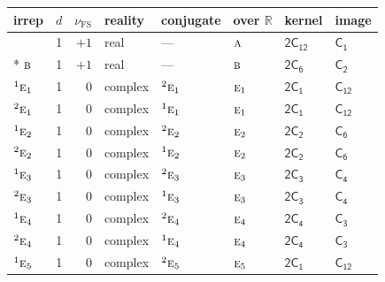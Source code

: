 \documentclass[10pt,a4paper]{article}
\numberwithin{equation}{section}
\newcommand{\grp}[1]{\mathsf{#1}}
\newcommand{\irr}[1]{\text{\normalfont\scshape #1}}
\newcommand{\conjpair}[1]{{}^{#1}}
\newcommand{\detbox}[1]{{\setlength{\fboxsep}{1pt}\fbox{#1}}}
\newcommand{\fsind}{\nu_{\mathrm{FS}}}
\begin{document}
{\small\renewcommand{\arraystretch}{1.25}\setlength{\tabcolsep}{4pt}\begin{longtable}{@{}lrrlllll@{}}\toprule
irrep & $d$ & $\fsind$ & reality & conjugate & over $\mathbb{R}$ & kernel & image\\\midrule\endhead
\bottomrule\endfoot\endlastfoot
\detbox{$\irr{a}$} & 1 & $+1$ & real & --- & $\irr{a}$ & \href{2C12.pdf}{$\grp{2C_{12}}$} & \href{../../../rotation/data/pdf/C1.pdf}{$\grp{C_{1}}$}\\*
$\irr{b}$ & 1 & $+1$ & real & --- & $\irr{b}$ & \href{2C6.pdf}{$\grp{2C_{6}}$} & \href{../../../rotation/data/pdf/C2.pdf}{$\grp{C_{2}}$}\\
$\conjpair{1}\irr{e}_{1}$ & 1 & $0$ & complex & $\conjpair{2}\irr{e}_{1}$ & $\irr{e}_{1}$ & \href{2C1.pdf}{$\grp{2C_{1}}$} & \href{../../../rotation/data/pdf/C12.pdf}{$\grp{C_{12}}$}\\
$\conjpair{2}\irr{e}_{1}$ & 1 & $0$ & complex & $\conjpair{1}\irr{e}_{1}$ & $\irr{e}_{1}$ & \href{2C1.pdf}{$\grp{2C_{1}}$} & \href{../../../rotation/data/pdf/C12.pdf}{$\grp{C_{12}}$}\\
$\conjpair{1}\irr{e}_{2}$ & 1 & $0$ & complex & $\conjpair{2}\irr{e}_{2}$ & $\irr{e}_{2}$ & \href{2C2.pdf}{$\grp{2C_{2}}$} & \href{../../../rotation/data/pdf/C6.pdf}{$\grp{C_{6}}$}\\
$\conjpair{2}\irr{e}_{2}$ & 1 & $0$ & complex & $\conjpair{1}\irr{e}_{2}$ & $\irr{e}_{2}$ & \href{2C2.pdf}{$\grp{2C_{2}}$} & \href{../../../rotation/data/pdf/C6.pdf}{$\grp{C_{6}}$}\\
$\conjpair{1}\irr{e}_{3}$ & 1 & $0$ & complex & $\conjpair{2}\irr{e}_{3}$ & $\irr{e}_{3}$ & \href{2C3.pdf}{$\grp{2C_{3}}$} & \href{../../../rotation/data/pdf/C4.pdf}{$\grp{C_{4}}$}\\
$\conjpair{2}\irr{e}_{3}$ & 1 & $0$ & complex & $\conjpair{1}\irr{e}_{3}$ & $\irr{e}_{3}$ & \href{2C3.pdf}{$\grp{2C_{3}}$} & \href{../../../rotation/data/pdf/C4.pdf}{$\grp{C_{4}}$}\\
$\conjpair{1}\irr{e}_{4}$ & 1 & $0$ & complex & $\conjpair{2}\irr{e}_{4}$ & $\irr{e}_{4}$ & \href{2C4.pdf}{$\grp{2C_{4}}$} & \href{../../../rotation/data/pdf/C3.pdf}{$\grp{C_{3}}$}\\
$\conjpair{2}\irr{e}_{4}$ & 1 & $0$ & complex & $\conjpair{1}\irr{e}_{4}$ & $\irr{e}_{4}$ & \href{2C4.pdf}{$\grp{2C_{4}}$} & \href{../../../rotation/data/pdf/C3.pdf}{$\grp{C_{3}}$}\\
$\conjpair{1}\irr{e}_{5}$ & 1 & $0$ & complex & $\conjpair{2}\irr{e}_{5}$ & $\irr{e}_{5}$ & \href{2C1.pdf}{$\grp{2C_{1}}$} & \href{../../../rotation/data/pdf/C12.pdf}{$\grp{C_{12}}$}\\

\end{longtable}}
\end{document}

